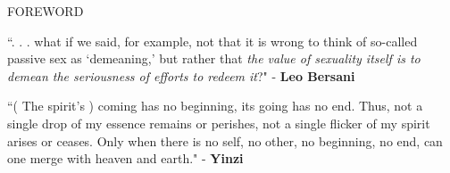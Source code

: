 \documentclass[11pt]{article}
\begin{document}
\vspace*{8\baselineskip}

\begingroup
\begin{center}
\huge FOREWORD
\end{center}
\endgroup

\vspace*{3\baselineskip}

\begingroup
\begin{center}
\large ``. . . what if we said, for example, not that it is wrong to think of so-called passive sex as `demeaning,' but rather that \textit{the value of sexuality itself is to demean the seriousness of efforts to redeem it}?"
\rightskip\leftskip
\phantom{text} \hfill - \textbf{Leo Bersani}
\end{center}
\endgroup

\begingroup
\begin{center}
\large ``( The spirit's ) coming has no beginning, its going has no end. Thus, not a single drop of my essence remains or perishes, not a single flicker of my spirit arises or ceases. Only when there is no self, no other, no beginning, no end, can one merge with heaven and earth."
\rightskip\leftskip
\phantom{text} \hfill - \textbf{Yinzi}
\end{center}
\endgroup
\end{document}
